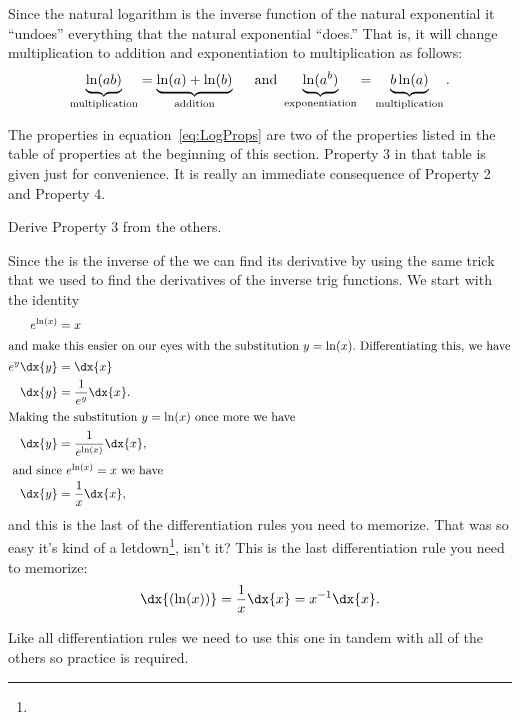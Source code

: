 Since the natural logarithm is the inverse function of the natural
exponential it ``undoes'' everything that the natural exponential
``does.'' That is, it will change multiplication to addition and
exponentiation to multiplication as follows:
\begin{equation}
  \underbrace{\ln(ab)}_{\text{multiplication}}=\underbrace{\ln(a)+\ln(b)}_{\text{addition}} \text{\hskip5mm{}and }
  \underbrace{\ln(a^b)}_{\text{exponentiation}}=\underbrace{b\ln(a)}_{\text{multiplication}}.
  \label{eq:LogProps}
\end{equation}

\begin{embeddedproblem}
The properties in equation~\ref{eq:LogProps} are two of the properties
listed in the table of properties at the beginning of this section.
Property 3 in that table is given just for convenience. It is really
an immediate consequence of Property 2 and Property 4.

Derive Property 3 from the others. 
\end{embeddedproblem}


Since the  is the inverse of the  we can find its derivative by using the same trick that
we used to find the derivatives of the inverse trig functions. We
start with the identity
\begin{align*}
  e^{\ln(x)}&=x\\
   \intertext{and  make this easier on our eyes with the substitution
   $y=\ln(x).$ Differentiating this, we have}
   e^y\dx{y} &= \dx{x}\\
   \dx{y}&=\frac{1}{e^y}\dx{x}.\\
   \intertext{Making the  substitution $y=\ln(x)$ once more we have}
   \dx{y}&=\frac{1}{e^{\ln(x)}}\dx{x},\\
   \intertext{ and since $e^{\ln(x)}=x$ we have}
   \dx{y}&=\frac{1}{x}\dx{x},\\
\end{align*}
and this is the last of the differentiation rules you need to
memorize. That was so easy it's kind of a letdown\footnote{}, isn't it?  This is the last
differentiation rule you need to
memorize:
$$
\dx{(\ln(x))}=\frac{1}{x}
\dx{x}=x^{-1} \dx{x}.
$$


 Like all differentiation rules we need to use this one in tandem with
 all of the others so practice is required.

